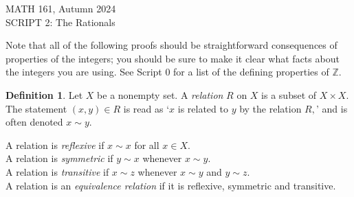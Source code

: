 \documentclass[11pt]{article}
\newcommand{\bbZ}{\mathbb{Z}}
\renewcommand{\_}[1]{\underline{ #1 }}
\newcommand{\head}[1]{
	\begin{center}
		{\large #1}
		\vspace{.2 in}
	\end{center}
	
	\bigskip 
}
\theoremstyle{definition}
\newtheorem{definition}[theorem]{Definition}
\numberwithin{equation}{subsection}
\begin{document}
\head{MATH 161, Autumn 2024\\ SCRIPT 2: The Rationals} 





\setcounter{section}{2}   


Note that all of the following proofs should be straightforward consequences of properties of the integers; you should be sure to make it clear what facts about the integers you are using. 
See Script 0 for a list of the defining properties of $\bbZ$. 

 
\begin{definition}
Let $X$ be a nonempty set. A {\em relation} $R$ on $X$ is a subset of $X\times X.$ The statement $(x,y)\in R$ is read as `$x$ is related to $y$ by the relation $R,$' and is often denoted $x\sim y.$ \medskip

\noindent A relation is {\em reflexive} if $x\sim x$ for all $x\in X.$\\
A relation is {\em symmetric} if $y\sim x$ whenever $x\sim y.$\\
A relation is {\em transitive} if  $x\sim z$ whenever $x\sim y$ and $y\sim z.$ \\
A relation is an {\em equivalence relation} if it is reflexive, symmetric and transitive.\medskip
\end{definition}
\end{document}
